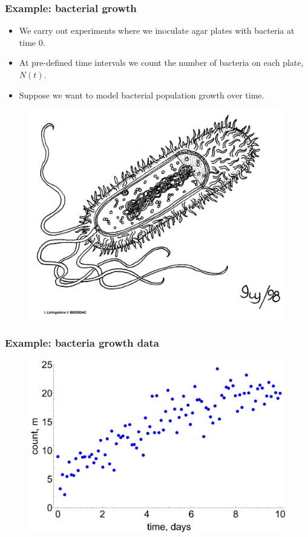 \documentclass[handout]{beamer}
\begin{document}
\begin{frame}
	\frametitle{Example: bacterial growth}
	\begin{itemize}
		\item<2-> We carry out experiments where we inoculate agar plates with bacteria at time 0.
		\item<3-> At pre-defined time intervals we count the number of bacteria on each plate, $N(t)$.
		\item<4-> Suppose we want to model bacterial population growth over time.
	\end{itemize}
	
	\begin{figure}[ht]
		\centerline{\includegraphics[width=1\textwidth]{animations_figures/bacteria.png}}
	\end{figure}
	
\end{frame}

\begin{frame}
	\frametitle{Example: bacteria growth data}
	
	\begin{figure}[ht]
		\centerline{\includegraphics[width=1\textwidth]{animations_figures/lec7_odeSingle.pdf}}
	\end{figure}
	
\end{frame}
\end{document}
